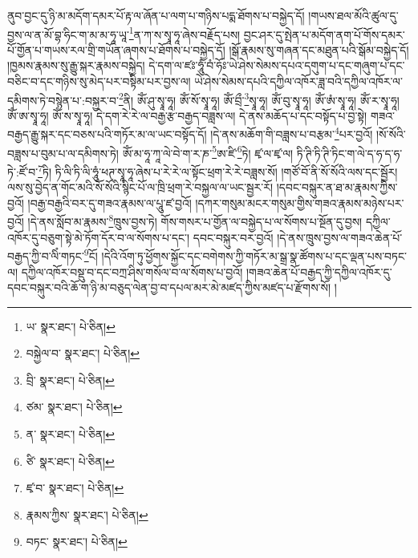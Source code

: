 ནུབ་བྱང་དུ་ཉི་མ་མདོག་དམར་པོ་རྟ་ལ་ཞོན་པ་ལག་པ་གཉིས་པདྨ་ཐོགས་པ་བསྐྱེད་དོ། །གཡས་ཐལ་མོའི་ཚུལ་དུ་བྱས་ལ་ན་མོ་བྷ་ཧིང་ག་མ་མ་ཧཱ་ཡཱ་\footnote{ཡ་  སྣར་ཐང་།  པེ་ཅིན། }ན་ཀ་ས་སྭཱ་ཧཱ་ཞེས་བརྗོད་པས། བྱང་ཤར་དུ་སྤེན་པ་མདོག་ནག་པོ་གོས་དམར་པོ་གྱོན་པ་གཡས་རལ་གྲི་གཡོན་ཞགས་པ་ཐོགས་པ་བསྐྱེད་དོ། །སྒོ་རྣམས་སུ་གཞན་དང་མཐུན་པའི་སྒོམ་བསྐྱེད་དོ། །ཁྱམས་རྣམས་སུ་རྒྱུ་སྐར་རྣམས་བསྐྱེད། དེ་དག་ལ་ཛཿ་ཧཱུཾ་བཾ་ཧོཿ་ཡེ་ཤེས་སེམས་དཔའ་དགུག་པ་དང་གཞུག་པ་དང་བཅིང་བ་དང་གཉིས་སུ་མེད་པར་བསྟིམ་པར་བྱས་ལ། ཡེ་ཤེས་སེམས་དཔའི་དཀྱིལ་འཁོར་ཟླ་བའི་དཀྱིལ་འཁོར་ལ་དམིགས་ཏེ་བསྙེན་པ་:བསྐྱར་བ་\footnote{བསྐྱེལ་བ་  སྣར་ཐང་།  པེ་ཅིན། }ནི། ཨོཾ་ཤུ་སྭཱ་ཧཱ། ཨོཾ་སོ་སྭཱ་ཧཱ། ཨོཾ་བྲྀ་\footnote{བྲི་  སྣར་ཐང་།  པེ་ཅིན། }སྭཱ་ཧཱ། ཨོཾ་བུ་སྭཱ་ཧཱ། ཨོཾ་ཨཾ་སྭཱ་ཧཱ། ཨོཾ་ར་སྭཱ་ཧཱ། ཨོཾ་ཨ་སྭཱ་ཧཱ། ཨོཾ་ས་སྭཱ་ཧཱ། དེ་དག་རེ་རེ་ལ་བརྒྱ་རྩ་བརྒྱད་བཟླས་ལ། དེ་ནས་མཆོད་པ་དང་བསྟོད་པ་བྱ་སྟེ། གཟའ་བརྒྱད་རྒྱུ་སྐར་དང་བཅས་པའི་གཏོར་མ་ལ་ཡང་བསྟོད་དོ། །དེ་ནས་མཆོག་གི་བཟླས་པ་བརྩམ་\footnote{ཙམ་  སྣར་ཐང་།  པེ་ཅིན། }པར་བྱའོ། །སོ་སོའི་བཟླས་པ་བུམ་པ་ལ་དམིགས་ཏེ། ཨོཾ་མ་ཧཱ་ཀཱ་ལེ་བེ་ག་ར་ཎ་\footnote{ན་  སྣར་ཐང་།  པེ་ཅིན། }ཨ་ཛི་\footnote{ཙི་  སྣར་ཐང་།  པེ་ཅིན། }ཏེ། ཛྭ་ལ་ཛྭ་ལ། ཏི་ཊི་ཏི་ཊི་ཏིང་ག་ལེ་ད་ཧ་ད་ཧ་ཏེ་:ཛོ་བ་\footnote{ཛྭ་བ་  སྣར་ཐང་།  པེ་ཅིན། }ཏི། ཏི་ལི་ཏི་ལི་ཧཱུཾ་ཕཊ་སྭཱ་ཧཱ་ཞེས་པ་རེ་རེ་ལ་སྟོང་ཕྲག་རེ་རེ་བཟླས་སོ། །གཙོ་བོ་ནི་སོ་སོའི་ལས་དང་སྦྱོར། ལས་སུ་བྱེད་ན་གོང་མའི་སོ་སོའི་སྙིང་པོ་ལ་ཁྲི་ཕྲག་རེ་བསྐྱལ་ལ་ཡང་སྦྱར་རོ། །དབང་བསྐུར་ན་ཐ་མ་རྣམས་ཀྱིས་བྱའོ། །བརྒྱ་བརྒྱའི་བར་དུ་གཟའ་རྣམས་ལ་པཱུ་ཛ་བྱའོ། །དཀར་གསུམ་མངར་གསུམ་གྱིས་གཟའ་རྣམས་མཉེས་པར་བྱའོ། །དེ་ནས་སློབ་མ་རྣམས་\footnote{རྣམས་ཀྱིས་  སྣར་ཐང་།  པེ་ཅིན། }ཁྲུས་བྱས་ཏེ། གོས་གསར་པ་གྱོན་ལ་བསྐྱེད་པ་ལ་སོགས་པ་སྔོན་དུ་བྱས། དཀྱིལ་འཁོར་དུ་བཅུག་སྟེ་མེ་ཏོག་དོར་བ་ལ་སོགས་པ་དང་། དབང་བསྐུར་བར་བྱའོ། །དེ་ནས་ཁྲུས་བྱས་ལ་གཟའ་ཆེན་པོ་བརྒྱད་ཀྱི་བ་ལིཾ་གཏང་\footnote{བཏང་  སྣར་ཐང་།  པེ་ཅིན། }ངོ། །དེའི་འོག་ཏུ་ཕྱོགས་སྐྱོང་དང་བགེགས་ཀྱི་གཏོར་མ་སྒྲ་སྣ་ཚོགས་པ་དང་ལྡན་པས་བཏང་ལ། དཀྱིལ་འཁོར་བསྡུ་བ་དང་བཀྲ་ཤིས་གསོལ་བ་ལ་སོགས་པ་བྱའོ། །གཟའ་ཆེན་པོ་བརྒྱད་ཀྱི་དཀྱིལ་འཁོར་དུ་དབང་བསྐུར་བའི་ཆོ་ག་ཉི་མ་བཅུད་ལེན་བྱ་བ་དཔལ་མར་མེ་མཛད་ཀྱིས་མཛད་པ་རྫོགས་སོ། ། 